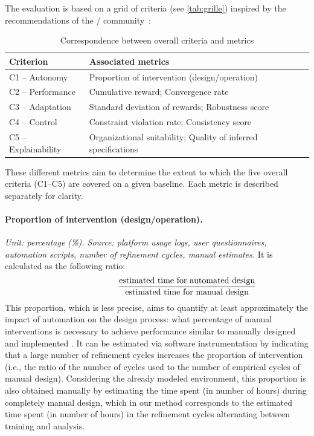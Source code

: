 The evaluation is based on a grid of criteria (see \autoref{tab:grille}) inspired by the recommendations of the / community~\cite{papoudakis2021agent}:

\begin{table}[h!]
  \centering
  \caption{Correspondence between overall criteria and metrics}
  \renewcommand{\arraystretch}{1.2}
  \begin{tabular}{ll}
    \hline
    \textbf{Criterion}   & \textbf{Associated metrics}                                    \\
    \hline
    C1 -- Autonomy       & Proportion of intervention (design/operation)                  \\
    C2 -- Performance    & Cumulative reward; Convergence rate                            \\
    C3 -- Adaptation     & Standard deviation of rewards; Robustness score                \\
    C4 -- Control        & Constraint violation rate; Consistency score                   \\
    C5 -- Explainability & Organizational suitability; Quality of inferred specifications \\
    \hline
  \end{tabular}
  \label{tab:grid}
\end{table}

These different metrics aim to determine the extent to which the five overall criteria (C1--C5) are covered on a given baseline.
Each metric is described separately for clarity.

\paragraph{Proportion of intervention (design/operation).}
\textit{Unit: percentage (\%). Source: platform usage logs, user questionnaires, automation scripts, number of refinement cycles, manual estimates.}
It is calculated as the following ratio:
\[
  \hspace{2.5cm}\frac{\text{estimated time for automated design}}{\text{estimated time for manual design}}
\]
This proportion, which is less precise, aims to quantify at least approximately the impact of automation on the design process: what percentage of manual interventions is necessary to achieve performance similar to manually designed and implemented . It can be estimated via software instrumentation by indicating that a large number of refinement cycles increases the proportion of intervention (i.e., the ratio of the number of cycles used to the number of empirical cycles of manual design). Considering the already modeled environment, this proportion is also obtained manually by estimating the time spent (in number of hours) during completely manual design, which in our method corresponds to the estimated time spent (in number of hours) in the refinement cycles alternating between training and analysis.

